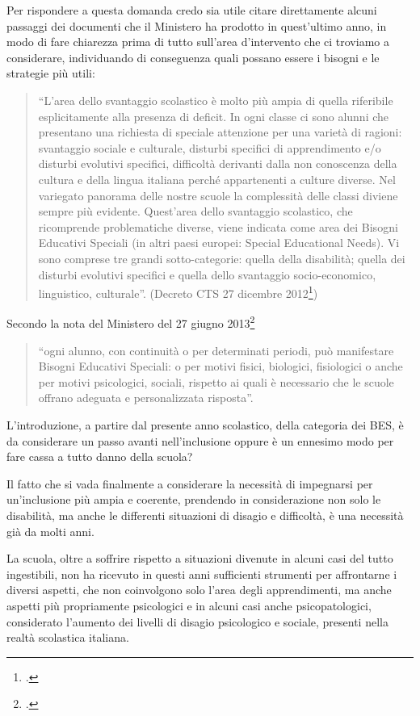 Per rispondere a questa domanda credo sia utile citare direttamente alcuni passaggi dei documenti che il Ministero ha prodotto in quest'ultimo anno, in modo di fare chiarezza prima di tutto sull'area d'intervento che ci troviamo a considerare, individuando di conseguenza quali possano essere i bisogni e le strategie più utili:
\begin{quote}
	“L'area dello svantaggio scolastico è molto più ampia di quella riferibile esplicitamente alla presenza di deficit. In ogni classe ci sono alunni che presentano una richiesta di speciale attenzione per una varietà di ragioni: svantaggio sociale e culturale, disturbi specifici di apprendimento e/o disturbi evolutivi specifici, difficoltà derivanti dalla non conoscenza della cultura e della lingua italiana perché appartenenti a culture diverse. Nel variegato panorama delle nostre scuole la complessità delle classi diviene sempre più evidente. Quest'area dello svantaggio scolastico, che ricomprende problematiche diverse, viene indicata come area dei Bisogni Educativi Speciali (in altri paesi europei: Special Educational Needs). Vi sono comprese tre grandi sotto-categorie: quella della disabilità; quella dei disturbi evolutivi specifici e quella dello svantaggio socio-economico, linguistico, culturale”. (Decreto CTS 27 dicembre 2012\footcite{dir27Dic2012})
\end{quote}
Secondo la nota del Ministero del 27 giugno 2013\footcite{Nota_1551_2013}
\begin{quote}
“ogni alunno, con continuità o per determinati periodi, può manifestare Bisogni Educativi Speciali: o per motivi fisici, biologici, fisiologici o anche per motivi psicologici, sociali, rispetto ai quali è necessario che le scuole offrano adeguata e personalizzata risposta”.
\end{quote}

L'introduzione, a partire dal presente anno scolastico, della categoria dei BES, è da considerare un passo avanti nell'inclusione oppure è un ennesimo modo per fare cassa a tutto danno della scuola?

Il fatto che si vada finalmente a considerare la necessità di impegnarsi per un'inclusione più ampia e coerente, prendendo in considerazione non solo le disabilità, ma anche le differenti situazioni di disagio e difficoltà, è una necessità già da molti anni.

La scuola, oltre a soffrire rispetto a situazioni divenute in alcuni casi del tutto ingestibili, non ha ricevuto in questi anni sufficienti strumenti per affrontarne i diversi aspetti, che non coinvolgono solo l'area degli apprendimenti, ma anche aspetti più propriamente psicologici e in alcuni casi anche psicopatologici, considerato l'aumento dei livelli di disagio psicologico e sociale, presenti nella realtà scolastica italiana.

